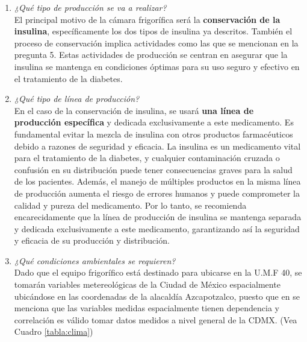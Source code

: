 \begin{enumerate}
\begin{multicols}{2}
\end{multicols}
 



	\item \textit{¿Qué tipo de producción se va a realizar?}\\
	El principal motivo de la cámara frigorífica será la \textbf{conservación de la insulina}, específicamente los dos tipos de insulina ya descritos. También el proceso de conservación implica actividades como las que se mencionan en la pregunta 5.	Estas actividades de producción se centran en asegurar que la insulina se mantenga en condiciones óptimas para su uso seguro y efectivo en el tratamiento de la diabetes.
	
	\item \textit{¿Qué tipo de línea de producción?}\\
En el caso de la conservación de insulina, se usará \textbf{una línea de producción específica} y dedicada exclusivamente a este medicamento. Es fundamental evitar la mezcla de insulina con otros productos farmacéuticos debido a razones de seguridad y eficacia. La insulina es un medicamento vital para el tratamiento de la diabetes, y cualquier contaminación cruzada o confusión en su distribución puede tener consecuencias graves para la salud de los pacientes. Además, el manejo de múltiples productos en la misma línea de producción aumenta el riesgo de errores humanos y puede comprometer la calidad y pureza del medicamento. Por lo tanto, se recomienda encarecidamente que la línea de producción de insulina se mantenga separada y dedicada exclusivamente a este medicamento, garantizando así la seguridad y eficacia de su producción y distribución. \cite{david-umf}
	\item \textit{¿Qué condiciones ambientales se requieren?}\\
	Dado que el equipo frigorífico está destinado para ubicarse en la U.M.F 40, se tomarán variables metereológicas de la Ciudad de México espacialmente ubicándose en las coordenadas de la alacaldía Azcapotzalco, puesto que en \cite{cressie-1993} se menciona que las variables medidas espacialmente tienen dependencia y correlación es válido tomar datos medidos a nivel general de la CDMX. (Vea Cuadro \ref{tabla:clima}) 
	 
		
		 

\end{enumerate}
